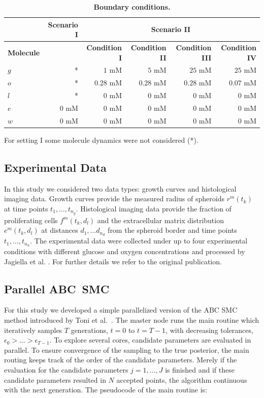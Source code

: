 \documentclass[10pt,letterpaper]{article}
\begin{document}
\begin{table}[!ht]
\begin{adjustwidth}{-0.5in}{0in} %
\caption{
{\bf Boundary conditions.}}
\begin{tabular}{|l |r |r|r|r|r|}
\hline
 			& {\bf Scenario I} & \multicolumn{4}{|c|}{\bf Scenario II}\\ \hline
{\bf Molecule} 	&				&{\bf Condition I} 	&{\bf Condition II} 	&{\bf Condition III} 	&{\bf Condition IV}\\ \hline
$g$			& * 				& $1$ mM			& $5$ mM			& $25$ mM			&$25$ mM\\ \hline
$o$			& *				& $0.28$ mM		& $0.28$ mM		& $0.28$ mM			&$0.07$ mM\\ \hline
$l$				& *				& $0$ mM			& $0$ mM			& $0$ mM				& $0$ mM\\ \hline
$e$			& $0$ mM		& $0$ mM			& $0$ mM			& $0$ mM				& $0$ mM\\ \hline
$w$			& $0$ mM		& $0$ mM			& $0$ mM			& $0$ mM				& $0$ mM\\ \hline
\end{tabular}
For setting I some molecule dynamics were not considered (*).
\label{tab:boundary conditions}
\end{adjustwidth}
\end{table}

\subsection*{Experimental Data}
In this study we considered two data types: growth curves and histological imaging data. Growth curves provide the measured radius of spheroids $r^m(t_k)$ at time points $t_1, \ldots, t_{n_g}$. Histological imaging data provide the fraction of proliferating cells $f^m(t_k,d_l)$ and the extracellular matrix distribution $e^m(t_k,d_l)$ at distances $d_1, \ldots d_{n_d}$ from the spheroid border and time points $t_1, \ldots, t_{n_h}$. The experimental data were collected under up to four experimental conditions with different glucose and oxygen concentrations and processed by Jagiella et al. \cite{JagiellaMul2015}. For further details we refer to the original publication.

\subsection*{Parallel ABC~SMC}
For this study we developed a simple parallelized version of the ABC SMC method introduced by Toni et al.~\cite{ToniWel2009}. The master node runs the main routine which iteratively samples $T$ generations, $t = 0$ to $t = T-1$, with decreasing tolerances, $\epsilon_0>\ldots>\epsilon_{T-1}$. To explore several cores, candidate parameters are evaluated in parallel. To ensure convergence of the sampling to the true posterior, the main routing keeps track of the order of the candidate parameters. Merely if the evaluation for the candidate parameters $j = 1,\ldots,J$ is finished and if these candidate parameters resulted in $N$ accepted points, the algorithm continuous with the next generation. The pseudocode of the main routine is:
\end{document}
